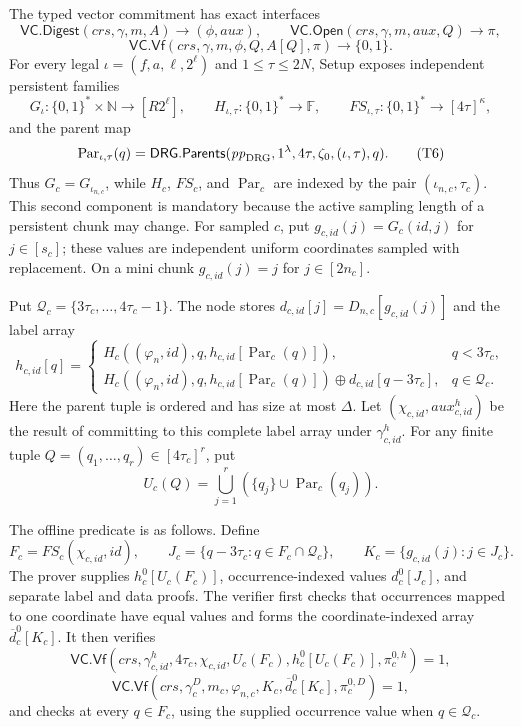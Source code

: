 \documentclass[11pt]{article}
\begin{document}
The typed vector commitment has exact interfaces
\[
 \mathsf{VC.Digest}(\mathit{crs},\gamma,m,A)\to(\phi,\mathit{aux}),
 \qquad
 \mathsf{VC.Open}(\mathit{crs},\gamma,m,\mathit{aux},Q)\to\pi,
\]
\[
 \mathsf{VC.Vf}(\mathit{crs},\gamma,m,\phi,Q,A[Q],\pi)
 \to\{0,1\}.
\tag{T4}\label{eq:vc-interface}
\]
For every legal $\iota=(f,a,\ell,2^\ell)$ and $1\le\tau\le2N$, Setup exposes
independent persistent families
\[
 G_\iota:\{0,1\}^{*}\times\mathbb N\to[R2^\ell],\qquad
 H_{\iota,\tau}:\{0,1\}^{*}\to\mathbb F,
 \qquad
 FS_{\iota,\tau}:\{0,1\}^{*}\to[4\tau]^\kappa,
\tag{T5}\label{eq:oracle-domains}
\]
and the parent map
\[
 \operatorname{Par}_{\iota,\tau}(q)=
 \mathsf{DRG.Parents}(\mathit{pp}_{\rm DRG},1^\lambda,4\tau,\zeta_0,
      (\iota,\tau),q).
\tag{T6}\label{eq:parent-domain}
\]
Thus $G_c=G_{\iota_{n,c}}$, while $H_c$, $FS_c$, and
$\operatorname{Par}_c$ are indexed by the pair
$(\iota_{n,c},\tau_c)$.  This second component is mandatory because the active
sampling length of a persistent chunk may change.  For sampled $c$, put
$g_{c,\mathit{id}}(j)=G_c(\mathit{id},j)$ for $j\in[s_c]$; these values are
independent uniform coordinates sampled with replacement.  On a mini chunk
$g_{c,\mathit{id}}(j)=j$ for $j\in[2n_c]$.

Put $\mathcal Q_c=\{3\tau_c,\ldots,4\tau_c-1\}$.  The node stores
$d_{c,\mathit{id}}[j]=D_{n,c}[g_{c,\mathit{id}}(j)]$ and the label array
\[
 h_{c,\mathit{id}}[q]=
 \begin{cases}
 H_c((\varphi_n,\mathit{id}),q,
       h_{c,\mathit{id}}[\operatorname{Par}_c(q)]),&q<3\tau_c,\\
 H_c((\varphi_n,\mathit{id}),q,
       h_{c,\mathit{id}}[\operatorname{Par}_c(q)])
       \mathbin\oplus d_{c,\mathit{id}}[q-3\tau_c],&q\in\mathcal Q_c.
 \end{cases}
\tag{T7}\label{eq:labels}
\]
Here the parent tuple is ordered and has size at most $\Delta$.  Let
$(\chi_{c,\mathit{id}},\mathit{aux}^h_{c,\mathit{id}})$ be the result of
committing to this complete label array under $\gamma^h_{c,\mathit{id}}$.
For any finite tuple $Q=(q_1,\ldots,q_r)\in[4\tau_c]^r$, put
\[
 U_c(Q)=\bigcup_{j=1}^r
   (\{q_j\}\cup\operatorname{Par}_c(q_j)).
\tag{T8}\label{eq:neighborhood}
\]

The offline predicate is as follows.  Define
\[
 F_c=FS_c(\chi_{c,\mathit{id}},\mathit{id}),\qquad
 J_c=\{q-3\tau_c:q\in F_c\cap\mathcal Q_c\},\qquad
 K_c=\{g_{c,\mathit{id}}(j):j\in J_c\}.
\tag{T9}\label{eq:offline-sets}
\]
The prover supplies $h^0_c[U_c(F_c)]$, occurrence-indexed values
$d^0_c[J_c]$, and separate label and data proofs.  The verifier first checks
that occurrences mapped to one coordinate have equal values and forms the
coordinate-indexed array $\overline d^0_c[K_c]$.  It then verifies
\[
 \mathsf{VC.Vf}(\mathit{crs},\gamma^h_{c,\mathit{id}},4\tau_c,
 \chi_{c,\mathit{id}},U_c(F_c),h^0_c[U_c(F_c)],\pi^{0,h}_c)=1,
\]
\[
 \mathsf{VC.Vf}(\mathit{crs},\gamma^D_c,m_c,
 \varphi_{n,c},K_c,\overline d^0_c[K_c],\pi^{0,D}_c)=1,
\tag{T10}\label{eq:offline-openings}
\]
and checks  at every $q\in F_c$, using the supplied
occurrence value when $q\in\mathcal Q_c$.
\end{document}
